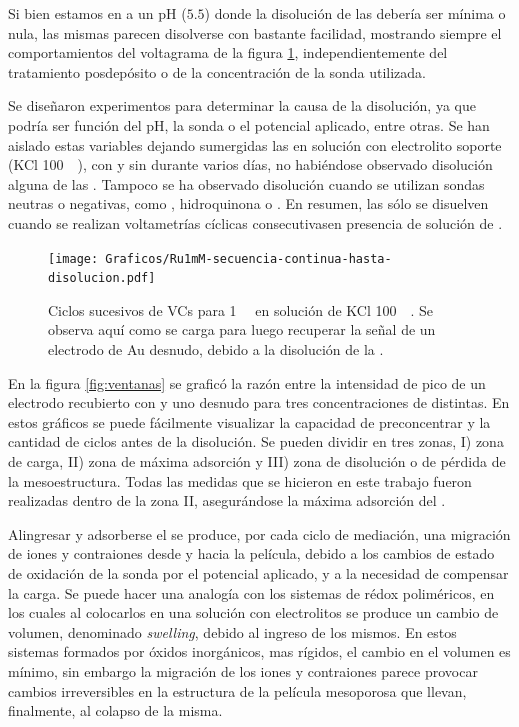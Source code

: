 		Si bien estamos en a un pH ($5.5$) donde la disolución de las \pdmF\space debería ser mínima o nula, las mismas parecen disolverse con bastante facilidad, mostrando siempre el comportamientos del voltagrama de la figura \ref{fig:diso_ru1mM}, independientemente del tratamiento posdepósito o de la concentración de la sonda utilizada. 

		Se diseñaron experimentos para determinar la causa de la disolución, ya que podría ser función del pH, la sonda o el potencial aplicado, entre otras. Se han aislado estas variables dejando sumergidas las \pdmF\space en solución con electrolito soporte (KCl \SI{100}{\milli\Molar}), con y sin \ru\space durante varios días, no habiéndose observado disolución alguna de las \pdm. Tampoco se ha observado disolución cuando se utilizan sondas neutras o negativas, como \fe, hidroquinona o \fc. En resumen, las \pdmF\space sólo se disuelven cuando se realizan voltametrías cíclicas consecutivasen presencia de solución de \ru\space.
			
		 	\begin{figure}[t!]
				\centering
		 	    \texttt{[image: Graficos/Ru1mM-secuencia-continua-hasta-disolucion.pdf]}
		        \caption[Disolución de una \pdmF\space en \ru.]{Ciclos sucesivos de VCs para \ru\space \SI{1}{\milli\Molar} en solución de KCl \SI{100}{\milli\Molar}. Se observa aquí como se carga para luego recuperar la señal de un electrodo de Au desnudo, debido a la disolución de la \pdmF.}
		        \label{fig:diso_ru1mM}
		      	\end{figure} 

	    En la figura \ref{fig:ventanas} se graficó la razón entre la intensidad de pico de un electrodo recubierto con \pdmF\space y uno desnudo para tres concentraciones de \ru\space distintas. En estos gráficos se puede fácilmente visualizar la capacidad de preconcentrar y la cantidad de ciclos antes de la disolución. Se pueden dividir en tres zonas, I) zona de carga, II) zona de máxima adsorción y III) zona de disolución o de pérdida de la mesoestructura. Todas las medidas que se hicieron en este trabajo fueron realizadas dentro de la zona II, asegurándose la máxima adsorción del \ru\space.


		Al\space ingresar y adsorberse el \ru\space se produce, por cada ciclo de mediación, una migración de iones y contraiones desde y hacia la película, debido a los cambios de estado de oxidación de la sonda por el potencial aplicado, y a la necesidad de compensar la carga.  Se puede hacer una analogía con los sistemas de rédox poliméricos, en los cuales al colocarlos en una solución con electrolitos se produce un cambio de volumen, denominado \textit{swelling}, debido al ingreso de los mismos\cite{ybarra2005}. En estos sistemas formados por óxidos inorgánicos, mas rígidos, el cambio en el volumen es mínimo,\cite{Malfatti2009} sin embargo la migración de los iones y contraiones parece provocar cambios irreversibles en la estructura de la película mesoporosa que llevan, finalmente, al colapso de la misma.

